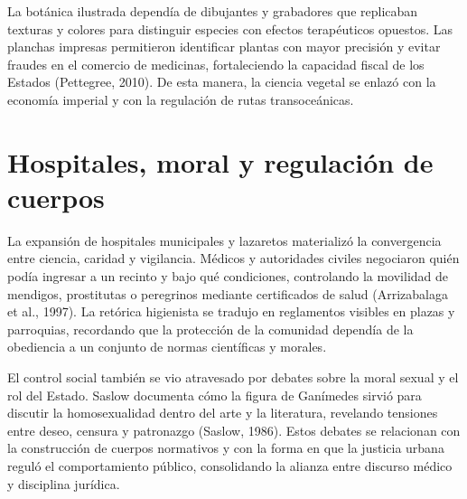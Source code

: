 La botánica ilustrada dependía de dibujantes y grabadores que replicaban texturas y colores para distinguir especies con efectos terapéuticos opuestos. Las planchas impresas permitieron identificar plantas con mayor precisión y evitar fraudes en el comercio de medicinas, fortaleciendo la capacidad fiscal de los Estados (Pettegree, 2010). De esta manera, la ciencia vegetal se enlazó con la economía imperial y con la regulación de rutas transoceánicas.

\section{Hospitales, moral y regulación de cuerpos}
La expansión de hospitales municipales y lazaretos materializó la convergencia entre ciencia, caridad y vigilancia. Médicos y autoridades civiles negociaron quién podía ingresar a un recinto y bajo qué condiciones, controlando la movilidad de mendigos, prostitutas o peregrinos mediante certificados de salud (Arrizabalaga et al., 1997). La retórica higienista se tradujo en reglamentos visibles en plazas y parroquias, recordando que la protección de la comunidad dependía de la obediencia a un conjunto de normas científicas y morales.

El control social también se vio atravesado por debates sobre la moral sexual y el rol del Estado. Saslow documenta cómo la figura de Ganímedes sirvió para discutir la homosexualidad dentro del arte y la literatura, revelando tensiones entre deseo, censura y patronazgo (Saslow, 1986). Estos debates se relacionan con la construcción de cuerpos normativos y con la forma en que la justicia urbana reguló el comportamiento público, consolidando la alianza entre discurso médico y disciplina jurídica.
